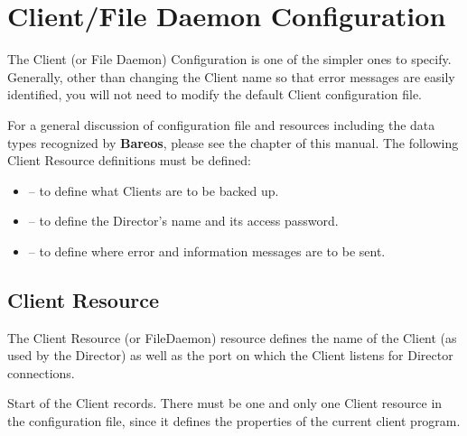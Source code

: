 
\chapter{Client/File Daemon Configuration}
\label{FiledConfChapter}

The Client (or File Daemon) Configuration is one of the simpler ones to
specify. Generally, other than changing the Client name so that error messages
are easily identified, you will not need to modify the default Client
configuration file.

For a general discussion of configuration file and resources including the
data types recognized by {\bf Bareos}, please see the
 chapter of this manual. The
following Client Resource definitions must be defined:

\begin{itemize}
\item
    -- to define what Clients are  to
   be backed up.
\item
    -- to  define the Director's
   name and its access password.
\item
    -- to define where error  and
   information messages are to be sent.
\end{itemize}

\section{Client Resource}
\label{ClientResourceClient}

The Client Resource (or FileDaemon) resource defines the name of the Client
(as used by the Director) as well as the port on which the Client listens for
Director connections.

Start of the Client records.  There must be one and only one Client resource
in the  configuration file, since it defines the properties of the  current
client program.





